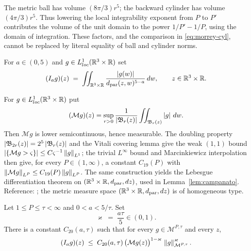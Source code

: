 \documentclass[11pt,reqno]{amsart}
\begin{document}
\begin{remark}
The metric ball has volume $(8\pi/3)r^5$; the backward cylinder has
volume $(4\pi/3)r^5$. Thus lowering the local integrability exponent from
$P$ to $P'$ contributes the volume of the unit domain to the power
$1/P'-1/P$, using the domain of integration. These factors, and the
comparison in \eqref{eq:morrey-cyl}, cannot be replaced by literal equality
of ball and cylinder norms.
\end{remark}

\begin{definition}\label{def:riesz-potential}
For $a\in(0,5)$ and $g\in L^{1}_{loc}(\mathbb{R}^{3}\times\mathbb{R})$ set
\begin{equation}\label{eq:riesz-potential}
  (I_{a}g)(z)\;=\;\iint_{\mathbb{R}^{3}\times\mathbb{R}}
     \frac{\left\lvert g(w) \right\rvert}{d_{\mathrm{par}}(z,w)^{5-a}}\,dw ,
  \qquad z\in\mathbb{R}^{3}\times\mathbb{R} .
\end{equation}
\end{definition}

\begin{externalinput}\label{ext:maximal}
For $g\in L^{1}_{loc}(\mathbb{R}^{3}\times\mathbb{R})$ put
\[
  (\mathcal{M}g)(z)=\sup_{r>0}\frac{1}{\left\lvert \mathfrak{B}_{r}(z) \right\rvert}
     \iint_{\mathfrak{B}_{r}(z)}\left\lvert g \right\rvert\,dw .
\]
Then $\mathcal{M}g$ is lower semicontinuous, hence measurable. The doubling
property $\left\lvert \mathfrak{B}_{2r}(z) \right\rvert=2^{5}\left\lvert \mathfrak{B}_{r}(z) \right\rvert$ and the
Vitali covering lemma give the weak $(1,1)$ bound
$\left\lvert \{\mathcal{M}g>\varsigma\} \right\rvert\le C\varsigma^{-1}\left\lVert g \right\rVert_{L^{1}}$; the
trivial $L^{\infty}$ bound and Marcinkiewicz interpolation then give, for every
$P\in(1,\infty)$, a constant $C_{19}(P)$ with
$\left\lVert \mathcal{M}g \right\rVert_{L^{P}}\le C_{19}(P)\left\lVert g \right\rVert_{L^{P}}$. The same
construction yields the Lebesgue differentiation theorem on
$(\mathbb{R}^{3}\times\mathbb{R},d_{\mathrm{par}},dz)$, used in Lemma~\ref{lem:campanato}.
Reference: \cite[Ch.~I]{Stein1970}; the metric measure space
$(\mathbb{R}^{3}\times\mathbb{R},d_{\mathrm{par}},dz)$ is of homogeneous type.
\end{externalinput}

\begin{lemma}\label{lem:hedberg}
Let $1\le P\le\tau<\infty$ and $0<a<5/\tau$. Set
\begin{equation}\label{eq:hedberg-lambda}
  \varkappa\;=\;\frac{a\tau}{5}\in(0,1).
\end{equation}
There is a constant $C_{20}(a,\tau)$ such that for every
$g\in\mathcal{M}^{P,\tau}$ and every $z$,
\begin{equation}\label{eq:hedberg}
  (I_{a}g)(z)\;\le\;C_{20}(a,\tau)\,
    \bigl(\mathcal{M}g(z)\bigr)^{1-\varkappa}\,
    \left\lVert g \right\rVert_{\mathcal{M}^{P,\tau}}^{\varkappa}.
\end{equation}
\end{lemma}
\end{document}
